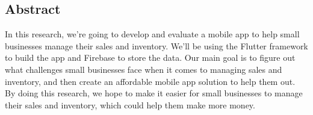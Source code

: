\documentclass[../thesis.tex]{subfiles}
\begin{document}
\begin{centering}
	\section*{Abstract}
	In this research, we’re going to develop and evaluate a mobile app to help small businesses manage their sales and inventory. We’ll be using the Flutter framework to build the app and Firebase to store the data. Our main goal is to figure out what challenges small businesses face when it comes to managing sales and inventory, and then create an affordable mobile app solution to help them out. By doing this research, we hope to make it easier for small businesses to manage their sales and inventory, which could help them make more money.
\end{centering}
\end{document}
